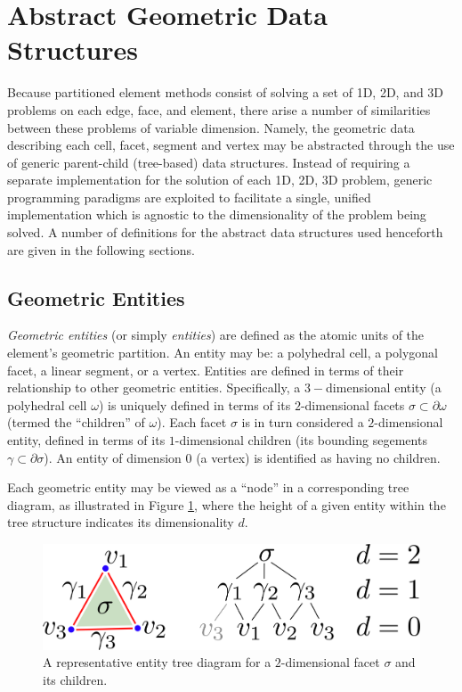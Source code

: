 \section{Abstract Geometric Data Structures}

	Because partitioned element methods consist of solving a set of 1D, 2D, and 3D problems on each edge, face, and element, there arise a number of similarities between these problems of variable dimension. Namely, the geometric data describing each cell, facet, segment and vertex may be abstracted through the use of generic parent-child (tree-based) data structures. Instead of requiring a separate implementation for the solution of each 1D, 2D, 3D problem, generic programming paradigms are exploited to facilitate a single, unified implementation which is agnostic to the dimensionality of the problem being solved. A number of definitions for the abstract data structures used henceforth are given in the following sections.
	
\subsection*{Geometric Entities}

	\textit{Geometric entities} (or simply \textit{entities}) are defined as the atomic units of the element's geometric partition. An entity may be: a polyhedral cell, a polygonal facet, a linear segment, or a vertex. Entities are defined in terms of their relationship to other geometric entities. Specifically, a $3-$dimensional entity (a polyhedral cell $\omega$) is uniquely defined in terms of its $2$-dimensional facets $\sigma \subset \partial \omega$ (termed the ``children'' of $\omega$). Each facet $\sigma$ is in turn considered a $2$-dimensional entity, defined in terms of its $1$-dimensional children (its bounding segements $\gamma \subset \partial \sigma$). An entity of dimension $0$ (a vertex) is identified as having no children.
	
	Each geometric entity may be viewed as a ``node'' in a corresponding tree diagram, as illustrated in Figure \ref{fig:entity_tree}, where the height of a given entity within the tree structure indicates its dimensionality $d$.
	\begin{figure} [!ht]
		\centering
		\includegraphics[width = 5.0in]{figures/entity_tree.pdf}
		\caption{A representative entity tree diagram for a $2$-dimensional facet $\sigma$ and its children.}
		\label{fig:entity_tree}
	\end{figure}
	
